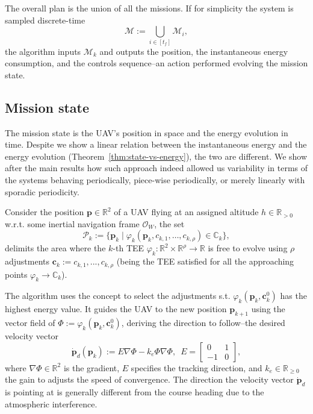 \documentclass[letterpaper,10pt,conference]{ieeeconf}
\theoremstyle{definition}
\begin{document}
The overall plan is the union of all the missions. If for simplicity the system is sampled discrete-time
\begin{equation}
  \mathcal{M}:=\bigcup_{i\in[t_f]}{\mathcal{M}_i},
\end{equation}
the algorithm inputs $\mathcal{M}_k$ and outputs the position, the instantaneous energy consumption, and the controls sequence--an action performed evolving the mission state.

\subsection{Mission state}
\label{sec:model}

The mission state is the UAV's position in space and the energy evolution in time. Despite we show a linear relation between the instantaneous energy and the energy evolution (Theorem~\ref{thm:state-vs-energy}), the two are different. We show after the main results how such approach indeed allowed us variability in terms of the systems behaving periodically, piece-wise periodically, or merely linearly with sporadic periodicity.

Consider the position $\mathbf{p}\in\mathbb{R}^2$ of a UAV flying at an assigned altitude $h\in\mathbb{R}_{>0}$ w.r.t. some inertial navigation frame $\mathcal{O}_W$, the set
\begin{equation}\label{eq:area}
  \mathcal{P}_k:=\{\mathbf{p}_k\mid\varphi_k(\mathbf{p}_k,c_{k,1},\dots,c_{k,\rho})\in\mathbb{C}_k\},
\end{equation}
delimits the area where the $k$-th TEE $\varphi_k:\mathbb{R}^2\times\mathbb{R}^{\rho}\rightarrow\mathbb{R}$ is free to evolve using $\rho$ adjustments $\mathbf{c}_k:=c_{k,1},...,c_{k,\rho}$ (being the TEE satisfied for all the approaching points $\varphi_k\rightarrow\mathbb{C}_k$).

The algorithm uses the concept to select the adjustments s.t. $\varphi_k(\mathbf{p}_k,\mathbf{c}_k^0)$ has the highest energy value. It guides the UAV to the new position $\mathbf{p}_{k+1}$ using the vector field of $\varPhi:=\varphi_k(\mathbf{p}_k,\mathbf{c}_k^0)$, deriving the direction to follow--the desired velocity vector
\begin{equation}\label{eq:pd}
  \dot{\mathbf{p}}_d(\mathbf{p}_k):=E\nabla\varPhi-k_e\varPhi\nabla\varPhi,\,\,\,E=\begin{bmatrix}
    0&1\\-1&0
  \end{bmatrix},
\end{equation}
where $\nabla\varPhi\in\mathbb{R}^2$ is the gradient, $E$ specifies the tracking direction, and $k_e\in\mathbb{R}_{\geq 0}$ the gain to adjusts the speed of convergence. The direction the velocity vector $\dot{\mathbf{p}}_d$ is pointing at is generally different from the course heading due to the atmospheric interference.
\end{document}
